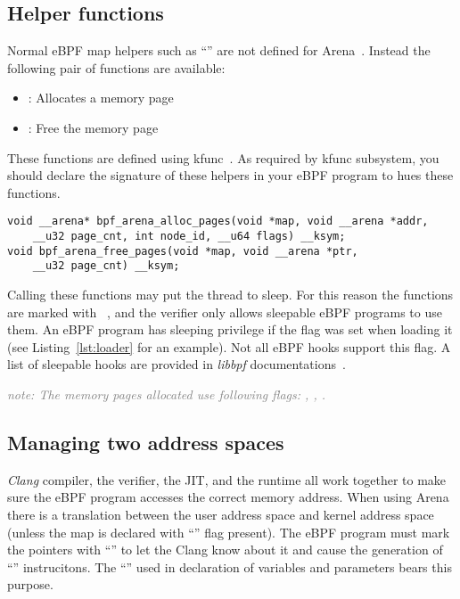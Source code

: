 \documentclass{article}
\begin{document}
\subsection{Helper functions}
Normal eBPF map helpers such as ``'' are not
defined for Arena~\cite{arena_source}. Instead the following pair of functions
are available:
\begin{itemize}
    \item {}: Allocates a memory page
    \item {}: Free the memory page
\end{itemize}

These functions are defined using kfunc~\cite{eunomia_kfunc, ebpf_docs_kfunc}.
As required by kfunc subsystem, you should declare the signature of these
helpers in your eBPF program to hues these functions.
\begin{minipage}{\linewidth}
\begin{flushleft}
\begin{lstlisting}[caption={Functions operating on Arena MAP.}, label={lst:arena_kfuncs}]
void __arena* bpf_arena_alloc_pages(void *map, void __arena *addr,
    __u32 page_cnt, int node_id, __u64 flags) __ksym;
void bpf_arena_free_pages(void *map, void __arena *ptr,
    __u32 page_cnt) __ksym;
\end{lstlisting}
\end{flushleft}
\end{minipage}

Calling these functions may put the thread to sleep. For this reason the
functions are marked with ~\cite{arena_source}, and the
verifier only allows sleepable eBPF programs to use them. An eBPF program has
sleeping privilege if the  flag was set when loading it
(see Listing~\ref{lst:loader} for an example).
Not all eBPF hooks support this flag. A list of sleepable
hooks are provided in \emph{libbpf} documentations~\cite{libbpf_sleepable}.

\textcolor{gray}{\emph{note: The memory pages allocated use following flags: , , .}}

\subsection{Managing two address spaces}

\emph{Clang} compiler, the verifier, the JIT, and the runtime all work together
to make sure the eBPF program accesses the correct memory address. When using
Arena there is a translation between the user address space and kernel address
space (unless the map is declared with ``'' flag
present). The eBPF program must mark the pointers with
``'' to let the Clang know about it and
cause the generation of ``'' instrucitons. The
``'' used in declaration of variables and parameters bears this
purpose.
\end{document}

